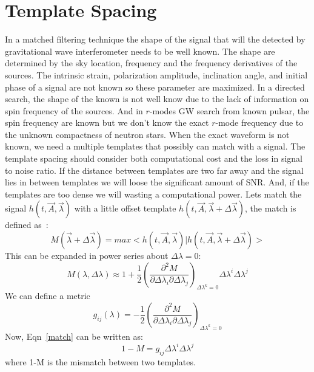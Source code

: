 \documentclass{ttuthes2007}
\begin{document}
\section{Template Spacing}
In a matched filtering technique the shape of the signal that will the detected
by gravitational wave interferometer needs to be well known. The shape are
determined by the sky location, frequency and the frequency derivatives of the
sources. The intrinsic strain, polarization amplitude, inclination angle, and
initial phase of a signal are not known so these parameter are maximized. In a
directed search, the shape of the known is not well know due to the lack of
information on spin frequency of the sources. And in $r$-modes \ac{GW} search
from known pulsar, the spin frequency are known but we don't know the exact
$r$-mode frequency due to the unknown compactness of neutron stars. When the
exact waveform is not known, we need a multiple templates that possibly can
match with a signal. The template spacing should consider both computational
cost and the loss in signal to noise ratio. If the distance between templates are two far away
and the signal lies in between templates we will loose the significant amount of
\ac{SNR}. And, if the templates are too dense we will wasting a computational
power.  Lets match the signal $h(t,\vec{A},\vec{\lambda})$ with a little offset template
 $h(t,\vec{A},\vec{\lambda}+\Delta\vec{\lambda})$, the match is defined
as~\cite{Owen_1996}:
\begin{equation}
M(\vec{\lambda}+\Delta\vec{\lambda}) =
max<h(t,\vec{A},\vec{\lambda})|h(t,\vec{A},\vec{\lambda}+\Delta\vec{\lambda})>
\end{equation}
This can be expanded in power series about $\Delta\lambda=0$:
\begin{equation}\label{match}
M(\lambda,\Delta\lambda)\approx
1+\frac{1}{2}\left(\frac{\partial^2M}{\partial\Delta\lambda_i\partial\Delta\lambda_j}\right)_{\Delta\lambda^k=0}
\Delta\lambda^i\Delta\lambda^j
\end{equation}
We can define a metric 
\begin{equation}
g_{ij}(\lambda)=-\frac{1}{2}\left(\frac{\partial^2M}{\partial\Delta\lambda_i\partial\Delta\lambda_j}\right)_{\Delta\lambda^k=0}
\end{equation}
Now, Eqn~\ref{match} can be written as:
\begin{equation}
1-M=g_{ij} \Delta\lambda^i\Delta\lambda^j
\end{equation}
where 1-M is the mismatch between two templates.
\end{document}
